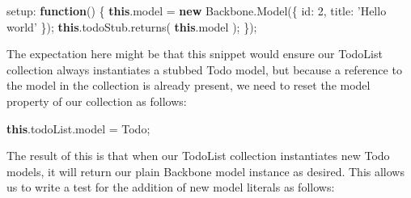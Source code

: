 \documentclass[9pt]{book}
\newenvironment{Shaded}{}{}
\newcommand{\KeywordTok}[1]{\textcolor[rgb]{0.00,0.44,0.13}{\textbf{{#1}}}}
\newcommand{\DataTypeTok}[1]{\textcolor[rgb]{0.56,0.13,0.00}{{#1}}}
\newcommand{\DecValTok}[1]{\textcolor[rgb]{0.25,0.63,0.44}{{#1}}}
\newcommand{\StringTok}[1]{\textcolor[rgb]{0.25,0.44,0.63}{{#1}}}
\newcommand{\OtherTok}[1]{\textcolor[rgb]{0.00,0.44,0.13}{{#1}}}
\newcommand{\FunctionTok}[1]{\textcolor[rgb]{0.02,0.16,0.49}{{#1}}}
\newcommand{\NormalTok}[1]{{#1}}
\begin{document}
\begin{Shaded}
\begin{Highlighting}[]
\NormalTok{setup: }\KeywordTok{function}\NormalTok{() \{}
    \KeywordTok{this}\NormalTok{.}\FunctionTok{model} \NormalTok{= }\KeywordTok{new} \OtherTok{Backbone}\NormalTok{.}\FunctionTok{Model}\NormalTok{(\{}
      \DataTypeTok{id}\NormalTok{: }\DecValTok{2}\NormalTok{,}
      \DataTypeTok{title}\NormalTok{: }\StringTok{'Hello world'}
    \NormalTok{\});}
    \KeywordTok{this}\NormalTok{.}\OtherTok{todoStub}\NormalTok{.}\FunctionTok{returns}\NormalTok{( }\KeywordTok{this}\NormalTok{.}\FunctionTok{model} \NormalTok{);}
\NormalTok{\});}
\end{Highlighting}
\end{Shaded}

The expectation here might be that this snippet would ensure our
TodoList collection always instantiates a stubbed Todo model, but
because a reference to the model in the collection is already present,
we need to reset the model property of our collection as follows:

\begin{Shaded}
\begin{Highlighting}[]
\KeywordTok{this}\NormalTok{.}\OtherTok{todoList}\NormalTok{.}\FunctionTok{model} \NormalTok{= Todo;}
\end{Highlighting}
\end{Shaded}

The result of this is that when our TodoList collection instantiates new
Todo models, it will return our plain Backbone model instance as
desired. This allows us to write a test for the addition of new model
literals as follows:
\end{document}
